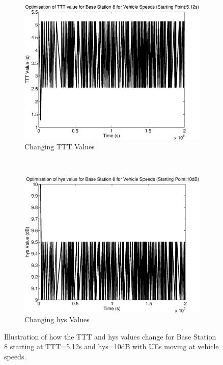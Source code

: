 \begin{figure}[H]
        \centering
        \begin{subfigure}[b]{0.49\textwidth}
                \includegraphics[width=\textwidth]{figures/graphs/vehhigh/TTT8.eps}
                \caption{Changing TTT Values}
        \end{subfigure}%
        ~ %
        \begin{subfigure}[b]{0.49\textwidth}
                \includegraphics[width=\textwidth]{figures/graphs/vehhigh/hys8.eps}
                \caption{Changing hys Values}
        \end{subfigure}
        \caption{Illustration of how the TTT and hys values change for Base Station 8 starting at TTT=5.12s and hys=10dB with UEs moving at vehicle speeds.}
\end{figure}
